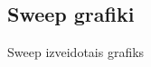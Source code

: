 \documentclass{report}
\begin{document}
\begin{figure}
\subsection{Sweep grafiki}
\caption{Sweep izveidotais grafiks}
\end{figure}
\end{document}
